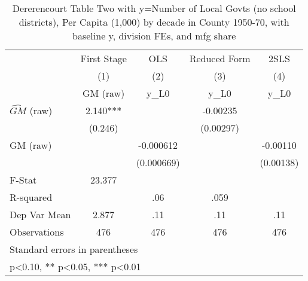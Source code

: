 \begin{table}[htbp]\centering
\def\sym#1{\ifmmode^{#1}\else\(^{#1}\)\fi}
\caption{Dererencourt Table Two with y=Number of Local Govts (no school districts), Per Capita (1,000) by decade in County 1950-70, with baseline y, division FEs, and mfg share}
\begin{tabular}{l*{4}{c}}
\toprule
                    & First Stage   &         OLS   &Reduced Form   &        2SLS   \\
                    &\multicolumn{1}{c}{(1)}&\multicolumn{1}{c}{(2)}&\multicolumn{1}{c}{(3)}&\multicolumn{1}{c}{(4)}\\
                    &\multicolumn{1}{c}{GM  (raw)}&\multicolumn{1}{c}{y\_L0}&\multicolumn{1}{c}{y\_L0}&\multicolumn{1}{c}{y\_L0}\\
\midrule
$\hat{GM}$ (raw)    &       2.140***&               &    -0.00235   &               \\
                    &     (0.246)   &               &   (0.00297)   &               \\
\addlinespace
GM  (raw)           &               &   -0.000612   &               &    -0.00110   \\
                    &               &  (0.000669)   &               &   (0.00138)   \\
\midrule
F-Stat              &      23.377   &               &               &               \\
R-squared           &               &         .06   &        .059   &               \\
Dep Var Mean        &       2.877   &         .11   &         .11   &         .11   \\
Observations        &         476   &         476   &         476   &         476   \\
\bottomrule
\multicolumn{5}{l}{\footnotesize Standard errors in parentheses}\\
\multicolumn{5}{l}{\footnotesize * p<0.10, ** p<0.05, *** p<0.01}\\
\end{tabular}
\end{table}
